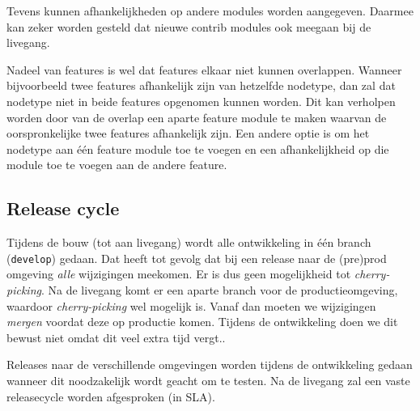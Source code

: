 Tevens kunnen afhankelijkheden op andere modules worden aangegeven. Daarmee kan zeker worden gesteld dat nieuwe contrib modules ook meegaan bij de livegang.

Nadeel van features is wel dat features elkaar niet kunnen overlappen. Wanneer bijvoorbeeld twee features afhankelijk zijn van hetzelfde nodetype, dan zal dat nodetype niet in beide features opgenomen kunnen worden. Dit kan verholpen worden door van de overlap een aparte feature module te maken waarvan de oorspronkelijke twee features afhankelijk zijn. Een andere optie is om het nodetype aan \'{e}\'{e}n feature module toe te voegen en een afhankelijkheid op die module toe te voegen aan de andere feature.

\subsection{Release cycle}

Tijdens de bouw (tot aan livegang) wordt alle ontwikkeling in \'{e}\'{e}n branch (\texttt{develop}) gedaan. Dat heeft tot gevolg dat bij een release naar de (pre)prod omgeving \emph{alle} wijzigingen meekomen. Er is dus geen mogelijkheid tot \emph{cherry-picking}.
Na de livegang komt er een aparte branch voor de productieomgeving, waardoor \emph{cherry-picking} wel mogelijk is. Vanaf dan moeten we wijzigingen \emph{mergen} voordat deze op productie komen. Tijdens de ontwikkeling doen we dit bewust niet omdat dit veel extra tijd vergt..

Releases naar de verschillende omgevingen worden tijdens de ontwikkeling gedaan wanneer dit noodzakelijk wordt geacht om te testen. Na de livegang zal een vaste releasecycle worden afgesproken (in SLA).



